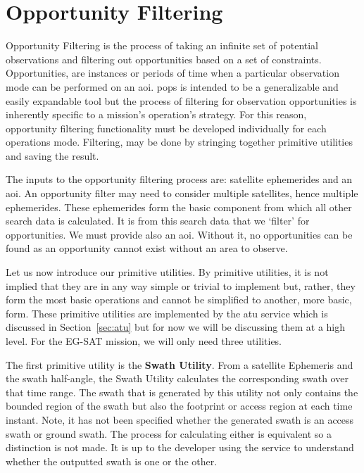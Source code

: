 \section{Opportunity Filtering} \label{sec:opp-filtering}

Opportunity Filtering is the process of taking an infinite set of potential
observations and filtering out opportunities based on a set of constraints.
Opportunities, are instances or periods of time when a particular observation
mode can be performed on an \gls{aoi}. \gls{pops} is intended to be a
generalizable and easily expandable tool but the process of filtering for
observation opportunities is inherently specific to a mission’s operation’s
strategy.  For this reason, opportunity filtering functionality must be
developed individually for each operations mode.  Filtering, may be done by
stringing together primitive utilities and saving the result. 

The inputs to the opportunity filtering process are: satellite ephemerides and
an \gls{aoi}. An opportunity filter may need to consider multiple satellites,
hence multiple ephemerides. These ephemerides form the basic component from
which all other search data is calculated. It is from this search data that we
`filter' for opportunities. We must provide also an \gls{aoi}.  Without it, no
opportunities can be found as an opportunity cannot exist without an area to
observe.

Let us now introduce our primitive utilities. By primitive utilities, it is not
implied that they are in any way simple or trivial to implement but, rather,
they form the most basic operations and cannot be simplified to another, more
basic, form.  These primitive utilities are implemented by the \gls{atu}
service which is discussed in Section~\ref{sec:atu} but for now we will be
discussing them at a high level. For the EG-SAT mission, we will only need
three utilities.

The first primitive utility is the \textbf{Swath Utility}. From a satellite
Ephemeris and the swath half-angle, the Swath Utility calculates the
corresponding swath over that time range. The swath that is generated by this
utility not only contains the bounded region of the swath but also the
footprint or access region at each time instant. Note, it has not been
specified whether the generated swath is an access swath or ground swath.  The
process for calculating either is equivalent so a distinction is not made.  It
is up to the developer using the service to understand whether the outputted
swath is one or the other.

